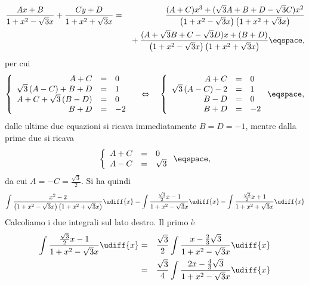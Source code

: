 \begin{Solution}
\begin{eqnarray*}
\frac{Ax +B}{1+x^{2} - \sqrt{3} x } + \frac{Cy +D}{1 +
x^{2} + \sqrt{3} x } &=& 
\frac{ (A+C)x ^{3} + ( \sqrt{3} A + B + D - \sqrt{3} C ) x^2 }%
{\left( 1+ x^{2} - \sqrt{3} x
\right)\left(1+x^{2} + \sqrt{3} x \right)} 
 \\
&&{} + \frac{(A + \sqrt{3} B + C - \sqrt{3} D) x + (B+D) }%
{\left( 1+ x^{2} - \sqrt{3} x
\right)\left(1+x^{2} + \sqrt{3} x \right)}  \eqspace ,
\end{eqnarray*}
per cui 
\begin{displaymath}
\left\{ \begin{array}{rcl}
A + C &=& 0 \\
\sqrt{3} \left( A -C\right) + B + D &=& 1 \\
A + C + \sqrt{3} \left( B -D \right) &=& 0 \\
B+D &=& -2 
\end{array} \right. 
\quad \Leftrightarrow \quad 
\left\{ \begin{array}{rcl} 
A + C &=& 0  \\
\sqrt{3} \left( A-C\right) -2 &=& 1 \\
B - D &=& 0 \\
B + D &=& -2 
\end{array} \right. \eqspace, 
\end{displaymath}
dalle ultime due equazioni si ricava immediatamente 
$B = D  = -1$, mentre dalla prime due si ricava 
\begin{displaymath}
\left\{ \begin{array}{rcl} A + C &=& 0 \\ A - C &=& \sqrt{3} \end{array} \right.
\eqspace, 
\end{displaymath}
da cui $ A = -C = \frac{\sqrt{3}}{2}$.
Si ha  quindi
\begin{displaymath}
\int 
\frac{x^{2} -2}{\left( 1 + x^{2} - \sqrt{3} x \right)\left( 1+x^{2} +
\sqrt{3} x \right)}  \udiff{x} =
\int 
\frac{\frac{\sqrt{3}}{2} x -1 }{1+x^{2} - \sqrt{3} x } \udiff{x} - \int
\frac{\frac{\sqrt{3}}{2} x +1}{1 +
x^{2} + \sqrt{3} x }  \udiff{x} 
\end{displaymath}
Calcoliamo i due integrali sul lato destro. Il primo \`e
\begin{eqnarray*}
\int \frac{ \frac{\sqrt{3}}{2} x - 1}{1 + x ^{2} - \sqrt{3} x}  \udiff{x} &=&
\frac{ \sqrt{3}}{2} \int \frac{ x - \frac{2}{3} \sqrt{3}}{1 + x^{2} - \sqrt{3} x
} \udiff{x} \\
&=&\frac{\sqrt{3}}{4} \int \frac{ 2 x - \frac{4}{3} \sqrt{3}}{1 + x ^{2} -
\sqrt{3} x } \udiff{x} \\

\end{eqnarray*}
\end{Solution}
